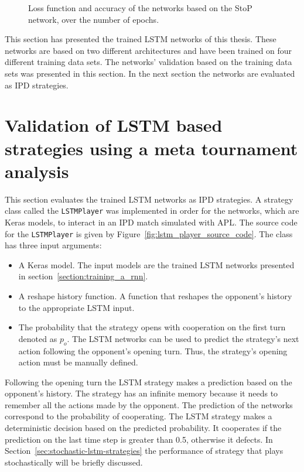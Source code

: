 \begin{figure}[!htbp]
\begin{subfigure}{\textwidth}
    \end{subfigure}
    \caption{Loss function and accuracy of the networks based on the StoP
    network, over the number of epochs.}\label{fig:validation_sequence_to_probability}
\end{figure}

This section has presented the \lstmnetworks trained LSTM networks of this thesis.
These networks are based on two different architectures and have been trained
on four different training data sets. The networks' validation based on the
training data sets was presented in this section. In the next section the networks
are evaluated as IPD strategies.

\section{Validation of LSTM based strategies using a meta tournament analysis}\label{section:rnn_strategy_validation}

This section evaluates the trained LSTM networks as IPD strategies.
A strategy class called the \texttt{LSTMPlayer} was implemented
in order for the networks, which are Keras models, to interact in an IPD match
simulated with APL. The source code for the \texttt{LSTMPlayer} is
given by Figure~\ref{fig:lstm_player_source_code}. The class has three input
arguments:

\begin{itemize}
    \item A Keras model. The input models are the \lstmnetworks trained LSTM networks
    presented in section~\ref{section:training_a_rnn}.
    \item A reshape history function. A function that reshapes the opponent's
    history to the appropriate LSTM input.
    \item The probability that the strategy opens with cooperation on the first turn denoted
    as \(p_o\). The LSTM networks can be used to predict the strategy's next
    action following the opponent's opening turn. Thus, the strategy's opening
    action must be manually defined.
\end{itemize}

Following the opening turn the LSTM strategy makes a prediction based on the
opponent's history. The strategy has an infinite memory because it needs to
remember all the actions made by the opponent. The prediction of the networks
correspond to the probability of cooperating. The LSTM strategy makes a deterministic
decision based on the predicted probability. It cooperates if the prediction
on the last time step is greater than 0.5, otherwise it defects.
In Section~\ref{sec:stochastic-lstm-strategies} the performance of strategy that
plays stochastically will be briefly discussed.

